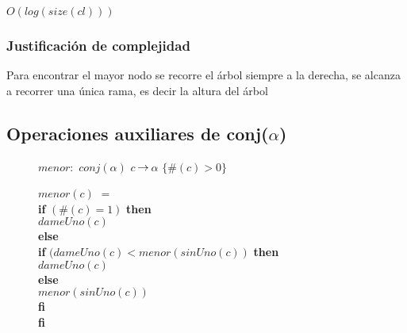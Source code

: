 {$O(log(size(cl)))$}

\subsubsection*{Justificación de complejidad}{
	Para encontrar el mayor nodo se recorre el árbol siempre a la derecha, se alcanza a recorrer una única rama, 
	es decir la altura del árbol
}

{}

\subsection{Operaciones auxiliares de conj($\alpha$)}


\begin{description} 
\item[] $menor:$ $conj(\alpha)$ $c$ $\!\rightarrow\!$ $\alpha$ \setlength{\parindent}{1cm} \indent $\{ \#(c)>0 \}$

\item[] $menor(c)$ $=$ 
	\setlength{\parindent}{1cm}\\ \textbf{if} $(\#(c) = 1)$ \textbf{then} 
		\\ \indent$dameUno(c)$
	\\ \textbf{else} 
		\\\indent  \textbf{if}  $(dameUno(c) < menor(sinUno(c))$ \textbf{then} 
			\\\indent \indent $dameUno(c)$
		\\\indent  \textbf{else} 
			\\\indent \indent$menor(sinUno(c))$
		\\\indent  \textbf{fi} 
	\\  \textbf{fi} 
\end{description}

